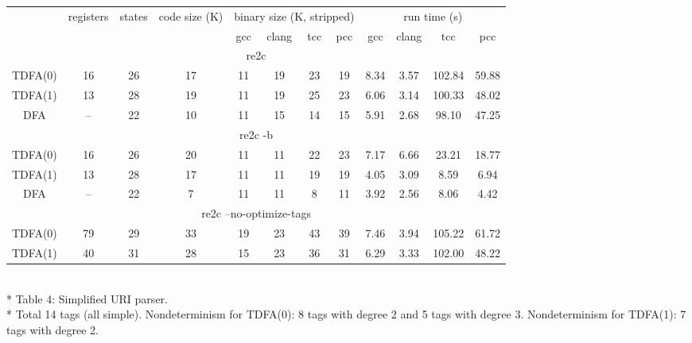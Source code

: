 \documentclass{article}
\theoremstyle{definition}
\begin{document}
\begin{center}
    \bigskip
    \begin{tabular}{|c|ccccccccccc|}
    \hline
    & registers & states & code size (K) & \multicolumn{4}{c}{binary size (K, stripped)} & \multicolumn{4}{c|}{run time (s)} \\
    & & &
        & gcc & clang & tcc & pcc
        & gcc & clang & tcc & pcc \\
    \hline \hline
    \multicolumn{12}{|c|}{re2c} \\
    \hline
    TDFA(0) & 16 & 26 & 17 & 11 & 19 & 23 & 19 & 8.34 & 3.57 & 102.84 & 59.88 \\
    TDFA(1) & 13 & 28 & 19 & 11 & 19 & 25 & 23 & 6.06 & 3.14 & 100.33 & 48.02 \\
    DFA     & -- & 22 & 10 & 11 & 15 & 14 & 15 & 5.91 & 2.68 &  98.10 & 47.25 \\
    \hline \hline
    \multicolumn{12}{|c|}{re2c -b} \\
    \hline
    TDFA(0) & 16 & 26 & 20 & 11 & 11 & 22 & 23 & 7.17 & 6.66 & 23.21 & 18.77 \\
    TDFA(1) & 13 & 28 & 17 & 11 & 11 & 19 & 19 & 4.05 & 3.09 &  8.59 &  6.94 \\
    DFA     & -- & 22 &  7 & 11 & 11 &  8 & 11 & 3.92 & 2.56 &  8.06 &  4.42 \\
    \hline \hline
    \multicolumn{12}{|c|}{re2c --no-optimize-tags} \\
    \hline
    TDFA(0) & 79 & 29 & 33 & 19 & 23 & 43 & 39 & 7.46 & 3.94 & 105.22 & 61.72 \\
    TDFA(1) & 40 & 31 & 28 & 15 & 23 & 36 & 31 & 6.29 & 3.33 & 102.00 & 48.22 \\
    \hline
    \end{tabular}\\*
    \medskip
    Table 4: Simplified URI parser.\\*
    \medskip
    \footnotesize{Total 14 tags (all simple).
    Nondeterminism for TDFA(0): 8 tags with degree 2 and 5 tags with degree 3.
    Nondeterminism for TDFA(1): 7 tags with degree 2.}
    \bigskip
\end{center}
\end{document}
